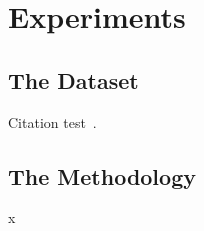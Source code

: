 
\chapter{Experiments}\label{chapter:experiments}

\section{The Dataset}
Citation test~\parencite{latex}.

\section{The Methodology}
x
